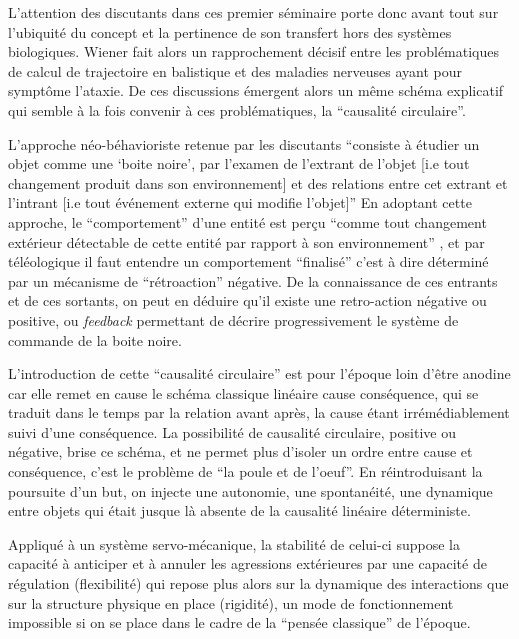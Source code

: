 L'attention des discutants dans ces premier séminaire porte donc avant tout sur l'ubiquité du concept et la pertinence de son transfert hors des systèmes biologiques. Wiener fait alors un rapprochement décisif entre les problématiques de calcul de trajectoire en balistique et des maladies nerveuses ayant pour symptôme l'ataxie. De ces discussions émergent alors un même schéma explicatif qui semble à la fois convenir à ces problématiques, la \enquote{causalité circulaire}. \autocite[774]{Pouvreau2013, Rosnay1975}

L'approche néo-béhavioriste retenue par les discutants \enquote{consiste à étudier un objet comme une \enquote{boite noire}, par l'examen de l'extrant de l'objet [i.e tout changement produit dans son environnement] et des relations entre cet extrant et l'intrant [i.e tout événement externe qui modifie l'objet]} \autocite{Pouvreau2013} En adoptant cette approche, le \enquote{comportement} d'une entité est perçu \enquote{comme tout changement extérieur détectable de cette entité par rapport à son environnement} , et par téléologique il faut entendre un comportement \enquote{finalisé} c'est à dire déterminé par un mécanisme de \enquote{rétroaction} négative. De la connaissance de ces entrants et de ces sortants, on peut en déduire qu'il existe une retro-action négative ou positive, ou \textit{feedback} permettant de décrire progressivement le système de commande de la boite noire.

L'introduction de cette \enquote{causalité circulaire} est pour l'époque loin d'être anodine car elle remet en cause le schéma classique linéaire cause \textrightarrow conséquence, qui se traduit dans le temps par la relation avant \textrightarrow après, la cause étant irrémédiablement suivi d'une conséquence. La possibilité de causalité circulaire, positive ou négative, brise ce schéma, et ne permet plus d'isoler un ordre entre cause et conséquence, c'est le problème de \enquote{la poule et de l'oeuf}. En réintroduisant la poursuite d'un but, on injecte une autonomie, une spontanéité, une dynamique entre objets qui était jusque là absente de la causalité linéaire déterministe.

Appliqué à un système servo-mécanique, la stabilité de celui-ci suppose la capacité à anticiper et à annuler les agressions extérieures par une capacité de régulation (flexibilité) qui repose plus alors sur la dynamique des interactions que sur la structure physique en place (rigidité), un mode de fonctionnement impossible si on se place dans le cadre de la \enquote{pensée classique} de l'époque. 


